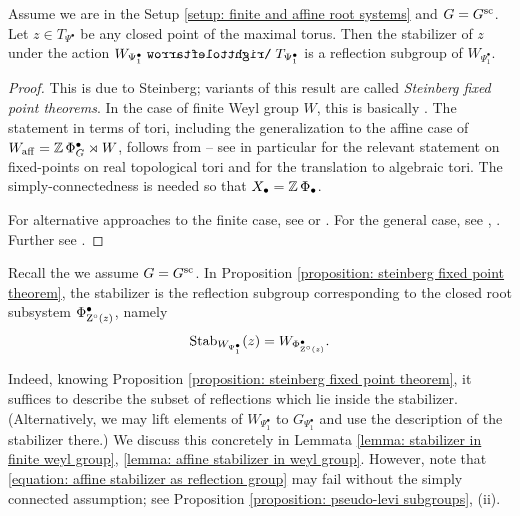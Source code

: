 \begin{proposition}\label{proposition: steinberg fixed point theorem}
Assume we are in the Setup \ref{setup: finite and affine root systems} and $G=G^{\sc}$. Let $ z \in T_{\Psi^{\bullet}}$ be any closed point of the maximal torus. Then the stabilizer of $z$ under the action $W_{\Psi^{\bullet}_1} \acts T_{\Psi^{\bullet}_1}$ is a reflection subgroup of $W_{\Psi^{\bullet}_1}$.
\end{proposition}
\begin{proof}
This is due to Steinberg; variants of this result are called \emph{Steinberg fixed point theorems}. In the case of finite Weyl group $W$, this is basically \cite[Theorem 1.5]{Ste64}. The statement in terms of tori, including the generalization to the affine case of $W_{\aff} = \Z\Phi^{\bullet}_G \rtimes W$, follows from \cite[\S 3, \S 4, \S 5]{Ste68} -- see in particular \cite[\S 4.2]{Ste68} for the relevant statement on fixed-points on real topological tori and \cite[\S 5.1 and \S 5.3 Theorem]{Ste68} for the translation to algebraic tori. The simply-connectedness is needed so that $X_{\bullet} = \Z\Phi_{\bullet}$.

For alternative approaches to the finite case, see \cite[chap. V]{Bou68} or \cite[Theorem 1.1]{Leh04}. For the general case, see \cite[Theorem 2.2]{PS19}, \cite[Introduction]{Pue23}. Further see \cite[\S 11, \S 12]{Kan01}.
\end{proof}

\begin{remark}
Recall the we assume $G=G^{\sc}$.
In Proposition \ref{proposition: steinberg fixed point theorem}, the stabilizer is the reflection subgroup corresponding to the closed root subsystem $\Phi^{\bullet}_{\Cent^{\circ}(z)}$, namely
\begin{equation}\label{equation: affine stabilizer as reflection group}
    \Stab_{W_{\Psi^{\bullet}_1}}(z) = W_{\Phi^{\bullet}_{\Cent^{\circ}(z)}}.
\end{equation}

Indeed, knowing Proposition \ref{proposition: steinberg fixed point theorem}, it suffices to describe the subset of reflections which lie inside the stabilizer. (Alternatively, we may lift elements of $W_{\Psi^{\bullet}_1}$ to $G_{\Psi^{\bullet}_1}$ and use the description of the stabilizer there.) We discuss this concretely in Lemmata \ref{lemma: stabilizer in finite weyl group}, \ref{lemma: affine stabilizer in weyl group}.
%
However, note that \eqref{equation: affine stabilizer as reflection group} may fail without the simply connected assumption; see Proposition \ref{proposition: pseudo-levi subgroups}, (ii). 
\end{remark}